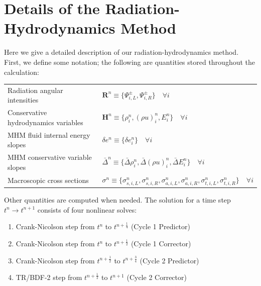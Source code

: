 \documentclass[preprint,12pt]{elsarticle}
\newcommand{\half}{\frac{1}{2}}
\newcommand{\fourth}{\frac{1}{4}}
\renewcommand{\H}{\mathbf{H}}
\newcommand{\R}{\mathbf{R}}
\newcommand{\iL}{_{i,L}}
\newcommand{\iR}{_{i,R}}
\begin{document}
\section{Details of the Radiation-Hydrodynamics Method}
Here we give a detailed description of our radiation-hydrodynamics method.
First, we define some notation; the following are quantities stored
throughout the calculation:
\begin{center}
\begin{tabular}{l|l}
   Radiation angular intensities & $\R^n \equiv \{\Psi^\pm\iL,\Psi^\pm\iR\} \quad\forall i$ \\
   Conservative hydrodynamics variables & $\H^n \equiv \{\rho_i^n, (\rho u)_i^n, E_i^n\} \quad\forall i$ \\
   MHM fluid internal energy slopes & $\delta e^n \equiv \{\delta e_i^n\} \quad\forall i$ \\
   MHM conservative variable slopes & $\bar{\Delta}^n \equiv \{\bar{\Delta}\rho_i^n, \bar{\Delta}(\rho u)_i^n,
     \bar{\Delta} E_i^n\} \quad\forall i$ \\
   Macroscopic cross sections & $\sigma^n \equiv \{\sigma_{s,i,L}^n, \sigma_{s,i,R}^n,
   \sigma_{a,i,L}^n, \sigma_{a,i,R}^n, \sigma_{t,i,L}^n, \sigma_{t,i,R}^n\}
   \quad\forall i$
\end{tabular}
\end{center}
Other quantities are computed when needed.
The solution for a time step $t^n\rightarrow t^{n+1}$ consists of four
nonlinear solves:
\begin{enumerate}
  \item Crank-Nicolson step from $t^n$ to $t^{n+\fourth}$
    (Cycle 1 Predictor)
  \item Crank-Nicolson step from $t^n$ to $t^{n+\half}$
    (Cycle 1 Corrector)
  \item Crank-Nicolson step from $t^{n+\half}$ to $t^{n+\frac{3}{4}}$
    (Cycle 2 Predictor)
  \item TR/BDF-2 step from $t^{n+\half}$ to $t^{n+1}$
    (Cycle 2 Corrector)
\end{enumerate}
\end{document}
